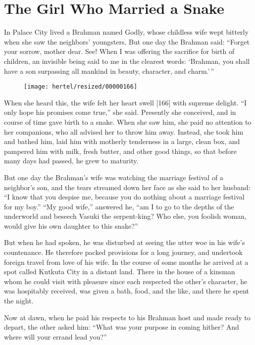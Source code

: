 \documentclass[article, twoside, 10pt]{memoir}
\begin{document}
\chapter{The Girl Who Married a Snake}

In Palace City lived a Brahman named Godly, whose childless wife
wept bitterly when she saw the neighbors' youngsters. But one day
the Brahman said:
``Forget your sorrow, mother dear. See! When I was offering the sacrifice for birth of children, an invisible being said to me in the clearest words: `Brahman, you shall have a son surpassing all mankind in beauty, character, and charm.'\,''

\begin{figure}[p]\texttt{[image: hertel/resized/00000166]}\end{figure}When she heard this, the wife felt her heart swell [166] with
supreme delight. ``I only hope his promises come true,'' she said.
Presently she conceived, and in course of time gave birth to a
snake. When she saw him, she paid no attention to her companions,
who all advised her to throw him away. Instead, she took him and
bathed him, laid him with motherly tenderness in a large, clean
box, and pampered him with milk, fresh butter, and other good
things, so that before many days had passed, he grew to maturity.

But one day the Brahman's wife was watching the marriage festival
of a neighbor's son, and the tears streamed down her face as she
said to her husband:
``I know that you despise me, because you do nothing about a marriage festival for my boy.''
``My good wife,'' answered he,
``am I to go to the depths of the underworld and beseech Vasuki the serpent-king? Who else, you foolish woman, would give his own daughter to this snake?''

But when he had spoken, he was disturbed at seeing the utter woe in
his wife's countenance. He therefore packed provisions for a long
journey, and undertook foreign travel from love of his wife. In the
course of some months he arrived at a spot called Kutkuta City in a
distant land. There in the house of a kinsman whom he could visit
with pleasure since each respected the other's character, he was
hospitably received, was given a bath, food, and the like, and
there he spent the night.

Now at dawn, when he paid his respects to his Brahman host and made
ready to depart, the other asked him:
``What was your purpose in coming hither? And where will your errand lead you?''
\end{document}
